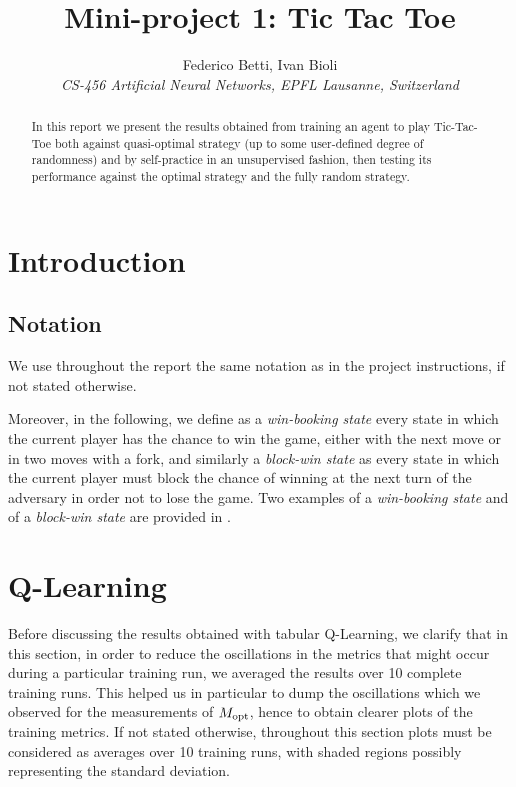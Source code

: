\documentclass[10pt]{IEEEtran}
\begin{document}
\title{Mini-project 1: Tic Tac Toe}

\author{
   Federico Betti, Ivan Bioli\\
  \textit{CS-456 Artificial Neural Networks, EPFL Lausanne, Switzerland}
}


\maketitle

\begin{abstract}
In this report we present the results obtained from training an agent to play Tic-Tac-Toe both against quasi-optimal strategy (up to some user-defined degree of randomness) and by self-practice in an unsupervised fashion, then testing its performance against the optimal strategy and the fully random strategy. 
\end{abstract}

\section{Introduction}
\subsection{Notation}
We use throughout the report the same notation as in the project instructions, if not stated otherwise.

Moreover, in the following, we define as a \emph{win-booking state} every state in which the current player has the chance to win the game, either with the next move or in two moves with a fork, and similarly a \emph{block-win state} as every state in which the current player must block the chance of winning at the next turn of the adversary in order not to lose the game. Two examples of a \emph{win-booking state} and of a \emph{block-win state} are provided in .

\section{Q-Learning}
Before discussing the results obtained with tabular Q-Learning, we clarify that in this section, in order to reduce the oscillations in the metrics that might occur during a particular training run, we averaged the results over 10 complete training runs. This helped us in particular to dump the oscillations which we observed for the measurements of $M_{\text{opt}}$, hence to obtain clearer plots of the training metrics. If not stated otherwise, throughout this section plots must be considered as averages over 10 training runs, with shaded regions possibly representing the standard deviation.
\end{document}
